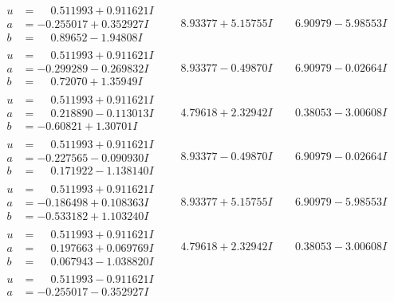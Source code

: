 \documentclass[1p]{elsarticle_modified}
\theoremstyle{definition}
\begin{document}
$$\begin{array}{c|c|c}
\begin{aligned}
u &= \phantom{-}0.511993 + 0.911621 I \\
a &= -0.255017 + 0.352927 I \\
b &= \phantom{-}0.89652 - 1.94808 I\end{aligned}
 & \phantom{-}8.93377 + 5.15755 I & \phantom{-}6.90979 - 5.98553 I \\ \hline\begin{aligned}
u &= \phantom{-}0.511993 + 0.911621 I \\
a &= -0.299289 - 0.269832 I \\
b &= \phantom{-}0.72070 + 1.35949 I\end{aligned}
 & \phantom{-}8.93377 - 0.49870 I & \phantom{-}6.90979 - 0.02664 I \\ \hline\begin{aligned}
u &= \phantom{-}0.511993 + 0.911621 I \\
a &= \phantom{-}0.218890 - 0.113013 I \\
b &= -0.60821 + 1.30701 I\end{aligned}
 & \phantom{-}4.79618 + 2.32942 I & \phantom{-}0.38053 - 3.00608 I \\ \hline\begin{aligned}
u &= \phantom{-}0.511993 + 0.911621 I \\
a &= -0.227565 - 0.090930 I \\
b &= \phantom{-}0.171922 - 1.138140 I\end{aligned}
 & \phantom{-}8.93377 - 0.49870 I & \phantom{-}6.90979 - 0.02664 I \\ \hline\begin{aligned}
u &= \phantom{-}0.511993 + 0.911621 I \\
a &= -0.186498 + 0.108363 I \\
b &= -0.533182 + 1.103240 I\end{aligned}
 & \phantom{-}8.93377 + 5.15755 I & \phantom{-}6.90979 - 5.98553 I \\ \hline\begin{aligned}
u &= \phantom{-}0.511993 + 0.911621 I \\
a &= \phantom{-}0.197663 + 0.069769 I \\
b &= \phantom{-}0.067943 - 1.038820 I\end{aligned}
 & \phantom{-}4.79618 + 2.32942 I & \phantom{-}0.38053 - 3.00608 I \\ \hline\begin{aligned}
u &= \phantom{-}0.511993 - 0.911621 I \\
a &= -0.255017 - 0.352927 I \\

\end{aligned}
\end{array}$$
\end{document}

